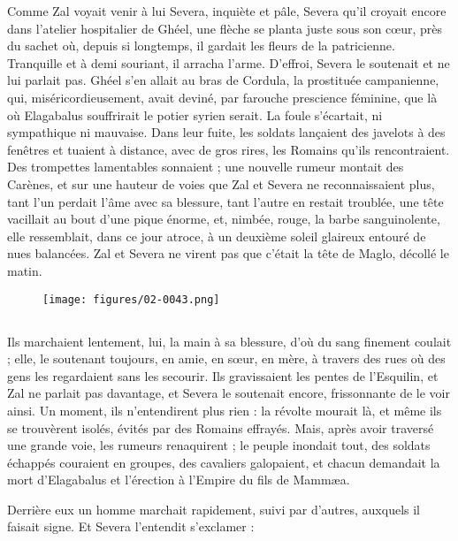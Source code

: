 \documentclass[a4paper, 11pt, oneside, polutonikogreek, french]{article}
\begin{document}
Comme Zal voyait venir à lui Severa, inquiète et pâle, Severa qu'il croyait encore dans l'atelier hospitalier de Ghéel, une flèche se planta juste sous son cœur, près du sachet où, depuis si longtemps, il gardait les fleurs de la patricienne. Tranquille et à demi souriant, il arracha l'arme. D'effroi, Severa le soutenait et ne lui parlait pas. Ghéel s'en allait au bras de Cordula, la prostituée campanienne, qui, miséricordieusement, avait deviné, par farouche prescience féminine, que là où Elagabalus souffrirait le potier syrien serait. La foule s'écartait, ni sympathique ni mauvaise. Dans leur fuite, les soldats lançaient des javelots à des fenêtres et tuaient à distance, avec de gros rires, les Romains qu'ils rencontraient. Des trompettes lamentables sonnaient ; une nouvelle rumeur montait des Carènes, et sur une hauteur de voies que Zal et Severa ne reconnaissaient plus, tant l'un perdait l'âme avec sa blessure, tant l'autre en restait troublée, une tête vacillait au bout d'une pique énorme, et, nimbée, rouge, la barbe sanguinolente, elle ressemblait, dans ce jour atroce, à un deuxième soleil glaireux entouré de nues balancées. Zal et Severa ne virent pas que c'était la tête de Maglo, décollé le matin.
\begin{figure}[H]
\centering
\texttt{[image: figures/02-0043.png]}
\end{figure}
\clearpage
\subsection{}
\paragraph{}
Ils marchaient lentement, lui, la main à sa blessure, d'où du sang finement coulait ; elle, le soutenant toujours, en amie, en sœur, en mère, à travers des rues où des gens les regardaient sans les secourir. Ils gravissaient les pentes de l'Esquilin, et Zal ne parlait pas davantage, et Severa le soutenait encore, frissonnante de le voir ainsi. Un moment, ils n'entendirent plus rien : la révolte mourait là, et même ils se trouvèrent isolés, évités par des Romains effrayés. Mais, après avoir traversé une grande voie, les rumeurs renaquirent ; le peuple inondait tout, des soldats échappés couraient en groupes, des cavaliers galopaient, et chacun demandait la mort d'Elagabalus et l'érection à l'Empire du fils de Mammæa.

Derrière eux un homme marchait rapidement, suivi par d'autres, auxquels il faisait signe. Et Severa l'entendit s'exclamer :
\end{document}
